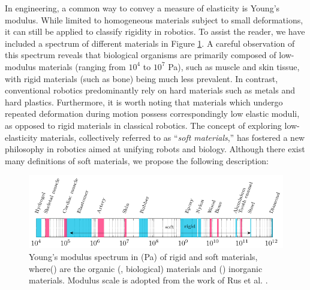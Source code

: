 In engineering, a common way to convey a measure of elasticity is Young's modulus. While limited to homogeneous materials subject to small deformations, it can still be applied to classify rigidity in robotics. To assist the reader, we have included a spectrum of different materials in Figure \ref{fig:1:1}.  A careful observation of this spectrum reveals that biological organisms are primarily composed of low-modulus materials (ranging from $10^4$ to $10^7$ \si{\pascal}), such as muscle and skin tissue, with rigid materials (such as bone) being much less prevalent. In contrast, conventional robotics predominantly rely on hard materials such as metals and hard plastics. Furthermore, it is worth noting that materials which undergo repeated deformation during motion possess correspondingly low elastic moduli, as opposed to rigid materials in classical robotics. The concept of exploring low-elasticity materials, collectively referred to as ``\emph{soft materials},'' has fostered a new philosophy in robotics aimed at unifying robots and biology. Although there exist many definitions of soft materials, we propose the following description:
%
\begin{figure}[!t]
    \centering
    \vspace{-3mm}
    \includegraphics*[width=\textwidth]{./pdf/thesis-figure-1-0.pdf}
    \caption{\small Young's modulus spectrum in (Pa) of rigid and soft materials, where() are the organic (\ie, biological) materials and () inorganic materials. Modulus scale is adopted from the work of Rus et al. \cite{Rus2015}.\label{fig:1:1}}
    \vspace{-4mm}
\end{figure}
%
\
